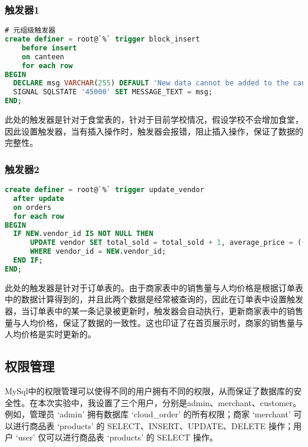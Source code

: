 \documentclass[lang=cn,a4paper,chinesefont=founder,bibend=bibtex]{shu-lab-report}
\begin{document}
\subsubsection{触发器1}
\begin{lstlisting}[language=SQL]
# 元组级触发器
create definer = root@`%` trigger block_insert
    before insert
    on canteen
    for each row
BEGIN
  DECLARE msg VARCHAR(255) DEFAULT 'New data cannot be added to the canteen table.';
  SIGNAL SQLSTATE '45000' SET MESSAGE_TEXT = msg;
END;
\end{lstlisting}

此处的触发器是针对于食堂表的，针对于目前学校情况，假设学校不会增加食堂，因此设置触发器，当有插入操作时，触发器会报错，阻止插入操作，保证了数据的完整性。

\subsubsection{触发器2}

\begin{lstlisting}[language=SQL]
create definer = root@`%` trigger update_vendor
  after update
  on orders
  for each row
BEGIN
  IF NEW.vendor_id IS NOT NULL THEN
      UPDATE vendor SET total_sold = total_sold + 1, average_price = ((average_price * total_sold) + NEW.actual_amount) / (total_sold + 1)
      WHERE vendor_id = NEW.vendor_id;
  END IF;
END;
\end{lstlisting}

此处的触发器是针对于订单表的。由于商家表中的销售量与人均价格是根据订单表中的数据计算得到的，并且此两个数据是经常被查询的，因此在订单表中设置触发器，当订单表中的某一条记录被更新时，触发器会自动执行，更新商家表中的销售量与人均价格，保证了数据的一致性。这也印证了在首页展示时，商家的销售量与人均价格是实时更新的。

\subsection{权限管理}

MySql中的权限管理可以使得不同的用户拥有不同的权限，从而保证了数据库的安全性。在本次实验中，我设置了三个用户，分别是admin、merchant、customer。例如，管理员 ‘admin’ 拥有数据库 ‘cloud\_order’ 的所有权限；商家 ‘merchant’ 可以进行商品表 ‘products’ 的 SELECT、INSERT、UPDATE、DELETE 操作；用户 ‘user’ 仅可以进行商品表 ‘products’ 的 SELECT 操作。
\end{document}
